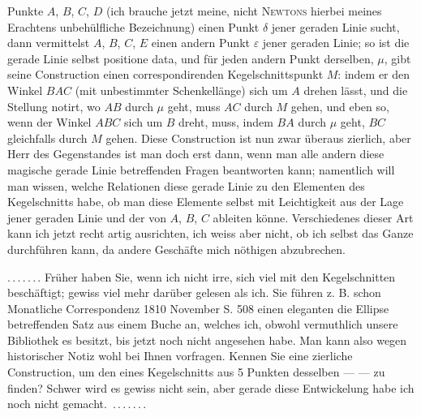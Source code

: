 %
Punkte $A$, $B$, $C$, $D$ (ich brauche jetzt meine, nicht \textsc{Newtons} hierbei
meines Erachtens unbehülfliche Bezeichnung) einen Punkt $\delta$ jener geraden Linie
sucht, dann vermittelst $A$, $B$, $C$, $E$ einen andern Punkt $\varepsilon$ jener
geraden Linie; so ist die gerade Linie selbst positione data, und für jeden andern
Punkt derselben, $\mu$, gibt seine Construction einen correspondirenden
Kegelschnittspunkt $M$: indem er den Winkel $BAC$ (mit unbestimmter Schenkellänge)
sich um $A$ drehen lässt, und die Stellung notirt, wo $AB$ durch $\mu$ geht, muss $AC$
durch $M$ gehen, und eben so, wenn der Winkel $ABC$ sich um $B$ dreht, muss, indem
$BA$ durch $\mu$ geht, $BC$ gleichfalls durch $M$ gehen. Diese Construction ist nun
zwar überaus zierlich, aber Herr des Gegenstandes ist man doch erst dann, wenn man
alle andern diese magische gerade Linie betreffenden Fragen beantworten kann;
namentlich will man wissen, welche Relationen diese gerade Linie zu den Elementen des
Kegelschnitts habe, ob man diese Elemente selbst mit Leichtigkeit aus der Lage jener
geraden Linie und der von $A$, $B$, $C$ ableiten könne. Verschiedenes dieser Art kann
ich jetzt recht artig ausrichten, ich weiss aber nicht, ob ich selbst das Ganze
durchführen kann, da andere Geschäfte mich nöthigen abzubrechen.

\mbox{.\,.\,.\,.\,.\,.\,.} Früher haben Sie, wenn ich nicht irre, sich viel mit den Kegelschnitten
beschäftigt; gewiss viel mehr darüber gelesen als ich. Sie führen z. B. schon
Monatliche Correspondenz 1810 November S. 508 einen eleganten die Ellipse betreffenden
Satz aus einem Buche an, welches ich, obwohl vermuthlich unsere Bibliothek es
besitzt, bis jetzt noch nicht angesehen habe. Man kann also wegen historischer Notiz
wohl bei Ihnen vorfragen. Kennen Sie eine zierliche Construction, um den 
eines Kegelschnitts aus 5 Punkten desselben ---  --- zu
finden? Schwer wird es gewiss nicht sein, aber gerade diese Entwickelung habe ich noch
nicht \mbox{gemacht. .\,.\,.\,.\,.\,.\,.}
